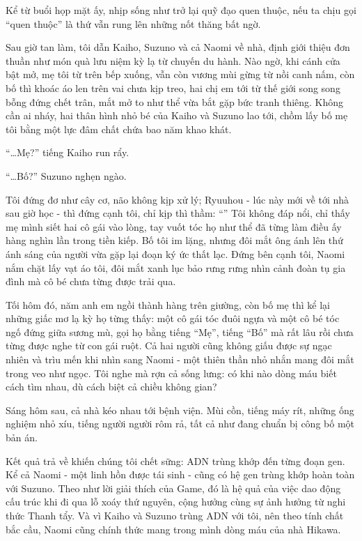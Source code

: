 \documentclass[../main.tex]{subfiles}
\begin{document}
\il

Kể từ buổi họp mặt ấy, nhịp sống như trở lại quỹ đạo quen thuộc, nếu ta chịu gọi ``quen thuộc'' là thứ vẫn rung lên những nốt thăng bất ngờ.

Sau giờ tan làm, tôi dẫn Kaiho, Suzuno và cả Naomi về nhà, định giới thiệu đơn thuần như món quà lưu niệm kỳ lạ từ chuyến du hành. Nào ngờ, khi cánh cửa bật mở, mẹ tôi từ trên bếp xuống, vẫn còn vương mùi gừng từ nồi canh nấm, còn bố thì khoác áo len trên vai chưa kịp treo, hai chị em tới từ thế giới song song bỗng đứng chết trân, mắt mở to như thể vừa bắt gặp bức tranh thiêng. Không cần ai nháy, hai thân hình nhỏ bé của Kaiho và Suzuno lao tới, chồm lấy bố mẹ tôi bằng một lực đâm chất chứa bao năm khao khát.

``\dots Mẹ?'' tiếng Kaiho run rẩy.

``\dots Bố?'' Suzuno nghẹn ngào.

Tôi đứng đơ như cây cơ, não không kịp xử lý; Ryuuhou - lúc này mới về tới nhà sau giờ học - thì đứng cạnh tôi, chỉ kịp thì thầm: ``'' Tôi không đáp nổi, chỉ thấy mẹ mình siết hai cô gái vào lòng, tay vuốt tóc họ như thể đã từng làm điều ấy hàng nghìn lần trong tiền kiếp. Bố tôi im lặng, nhưng đôi mắt ông ánh lên thứ ánh sáng của người vừa gặp lại đoạn ký ức thất lạc. Đứng bên cạnh tôi, Naomi nắm chặt lấy vạt áo tôi, đôi mắt xanh lục bảo rưng rưng nhìn cảnh đoàn tụ gia đình mà cô bé chưa từng được trải qua.

Tối hôm đó, năm anh em ngồi thành hàng trên giường, còn bố mẹ thì kể lại những giấc mơ lạ kỳ họ từng thấy: một cô gái tóc đuôi ngựa và một cô bé tóc ngố đứng giữa sương mù, gọi họ bằng tiếng ``Mẹ'', tiếng ``Bố'' mà rất lâu rồi chưa từng được nghe từ con gái ruột. Cả hai người cũng không giấu được sự ngạc nhiên và trìu mến khi nhìn sang Naomi - một thiên thần nhỏ nhắn mang đôi mắt trong veo như ngọc. Tôi nghe mà rợn cả sống lưng: có khi nào dòng máu biết cách tìm nhau, dù cách biệt cả chiều không gian?

Sáng hôm sau, cả nhà kéo nhau tới bệnh viện. Mùi cồn, tiếng máy rít, những ống nghiệm nhỏ xíu, tiếng người người rôm rả, tất cả như đang chuẩn bị công bố một bản án.

Kết quả trả về khiến chúng tôi chết sững: ADN trùng khớp đến từng đoạn gen. Kể cả Naomi - một linh hồn được tái sinh - cũng có hệ gen trùng khớp hoàn toàn với Suzuno. Theo như lời giải thích của Game, đó là hệ quả của việc dao động cấu trúc khi đi qua lỗ xoáy thứ nguyên, cộng hưởng cùng sự ảnh hưởng từ nghi thức Thanh tẩy. Và vì Kaiho và Suzuno trùng ADN với tôi, nên theo tính chất bắc cầu, Naomi cũng chính thức mang trong mình dòng máu của nhà Hikawa.
\end{document}
